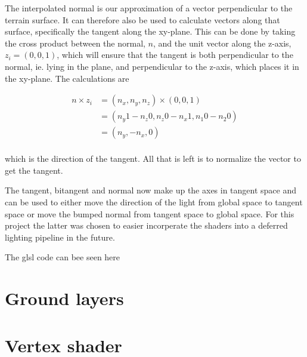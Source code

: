 The interpolated normal is our approximation of a vector perpendicular
to the terrain surface. It can therefore also be used to calculate
vectors along that surface, specifically the tangent along the
xy-plane. This can be done by taking the cross product between the
normal, $n$, and the unit vector along the z-axis, $z_i = (0,0,1)$, which
will ensure that the tangent is both perpendicular to the normal, ie.
lying in the plane, and perpendicular to the z-axis, which places it
in the xy-plane. The calculations are

\begin{displaymath}
  \begin{array}{rl}
  n \times z_i &= (n_x, n_y, n_z) \times (0,0,1)\\
  &= (n_y 1 - n_z 0, n_z 0 - n_x 1, n_1 0 - n_2 0) \\
  &= (n_y, - n_x, 0) \\
  \end{array}
\end{displaymath}

which is the direction of the tangent. All that is left is to
normalize the vector to get the tangent.

The tangent, bitangent and normal now make up the axes in tangent
space and can be used to either move the direction of the light from
global space to tangent space or move the bumped normal from tangent
space to global space. For this project the latter was chosen to
easier incorperate the shaders into a deferred lighting pipeline in
the future.

The glsl code can bee seen here


\section{Ground layers}



\section{Vertex shader}



